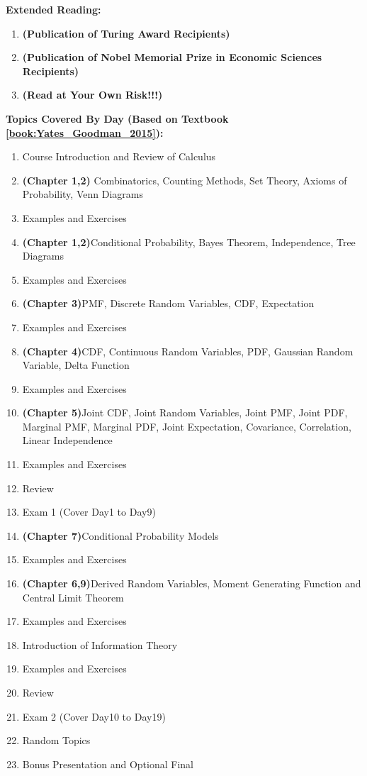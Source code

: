 \documentclass{article}
\begin{document}
\textbf{Extended Reading:}{
    \begin{enumerate}
            \item \textbf{(Publication of Turing Award Recipients)} 
            \item \textbf{(Publication of Nobel Memorial Prize in Economic Sciences Recipients)} 
            \item \textbf{(Read at Your Own Risk!!!)} 
    \end{enumerate}
}

\textbf{Topics Covered By Day (Based on Textbook \cref{book:Yates_Goodman_2015}):} {
    \begin{enumerate}
        \item Course Introduction and Review of Calculus
        \item \textbf{(Chapter 1,2)} Combinatorics, Counting Methods, Set Theory, Axioms of Probability, Venn Diagrams
        \item Examples and Exercises
        \item \textbf{(Chapter 1,2)}Conditional Probability, Bayes Theorem, Independence, Tree Diagrams
        \item Examples and Exercises
        \item \textbf{(Chapter 3)}PMF, Discrete Random Variables, CDF, Expectation
        \item Examples and Exercises
        \item \textbf{(Chapter 4)}CDF, Continuous Random Variables, PDF, Gaussian Random Variable, Delta Function
        \item Examples and Exercises
        \item \textbf{(Chapter 5)}Joint CDF, Joint Random Variables, Joint PMF, Joint PDF, Marginal PMF, Marginal PDF, Joint Expectation, Covariance, Correlation, Linear Independence
        \item Examples and Exercises
        \item Review
        \item Exam 1 (Cover Day1 to Day9)
        \item \textbf{(Chapter 7)}Conditional Probability Models
        \item Examples and Exercises
        \item \textbf{(Chapter 6,9)}Derived Random Variables, Moment Generating Function and Central Limit Theorem
        \item Examples and Exercises
        \item Introduction of Information Theory
        \item Examples and Exercises
        \item Review
        \item Exam 2 (Cover Day10 to Day19)
        \item Random Topics
        \item Bonus Presentation and Optional Final
    \end{enumerate}
}
\end{document}
